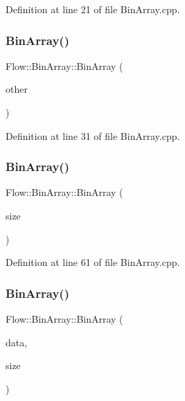 Definition at line 21 of file Bin\+Array.\+cpp.

\hypertarget{class_flow_1_1_bin_array_a724678cc512fa1af237828f00ae399b9}{}\label{class_flow_1_1_bin_array_a724678cc512fa1af237828f00ae399b9} 
\subsubsection{\texorpdfstring{Bin\+Array()}{BinArray()}\hspace{0.1cm}{\footnotesize\ttfamily [2/4]}}
{\footnotesize\ttfamily Flow\+::\+Bin\+Array\+::\+Bin\+Array (\begin{DoxyParamCaption}\item[{const \hyperlink{class_flow_1_1_bin_array}{Bin\+Array} \&}]{other }\end{DoxyParamCaption})}



Definition at line 31 of file Bin\+Array.\+cpp.

\hypertarget{class_flow_1_1_bin_array_a9be6e4200112d2be0acda60bc3e00e54}{}\label{class_flow_1_1_bin_array_a9be6e4200112d2be0acda60bc3e00e54} 
\subsubsection{\texorpdfstring{Bin\+Array()}{BinArray()}\hspace{0.1cm}{\footnotesize\ttfamily [3/4]}}
{\footnotesize\ttfamily Flow\+::\+Bin\+Array\+::\+Bin\+Array (\begin{DoxyParamCaption}\item[{int}]{size }\end{DoxyParamCaption})}



Definition at line 61 of file Bin\+Array.\+cpp.

\hypertarget{class_flow_1_1_bin_array_a00ae7fecb962afef80f01f69b02c31e4}{}\label{class_flow_1_1_bin_array_a00ae7fecb962afef80f01f69b02c31e4} 
\subsubsection{\texorpdfstring{Bin\+Array()}{BinArray()}\hspace{0.1cm}{\footnotesize\ttfamily [4/4]}}
{\footnotesize\ttfamily Flow\+::\+Bin\+Array\+::\+Bin\+Array (\begin{DoxyParamCaption}\item[{const char $\ast$}]{data,  }\item[{unsigned int}]{size }\end{DoxyParamCaption})}



